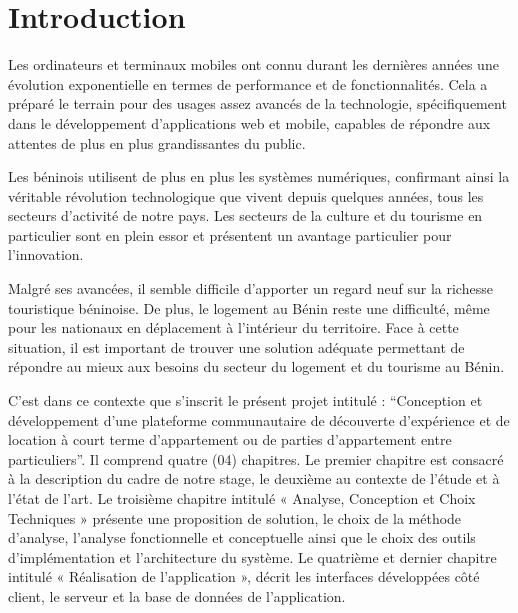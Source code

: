 \cleardoublepage
{}
\chapter*{Introduction}
Les ordinateurs et terminaux mobiles ont connu durant les dernières années une évolution exponentielle en termes de performance et de fonctionnalités. Cela a préparé le terrain pour des usages assez avancés de la technologie, spécifiquement dans le développement d’applications web et mobile, capables de répondre aux attentes de plus en plus grandissantes du public.

Les béninois utilisent de plus en plus les systèmes numériques, confirmant ainsi la véritable révolution technologique que vivent depuis quelques années, tous les secteurs d’activité de notre pays. Les secteurs de la culture et du tourisme en particulier sont en plein essor et présentent un avantage particulier pour l’innovation. 

Malgré ses avancées, il semble difficile d’apporter un regard neuf sur la richesse touristique béninoise. De plus, le logement au Bénin reste une difficulté, même pour les nationaux en déplacement à l'intérieur du territoire. Face à cette situation, il est important de trouver une solution adéquate permettant de répondre au mieux aux besoins du secteur du logement et du tourisme au Bénin.

C’est dans ce contexte que s’inscrit le présent projet intitulé : “Conception et développement d’une plateforme communautaire de découverte d’expérience et de location à court terme d’appartement ou de parties d’appartement entre particuliers”. Il comprend quatre (04) chapitres. Le premier chapitre est consacré à la description du cadre de notre stage, le deuxième au contexte de l’étude et à l’état de l’art. Le troisième chapitre intitulé « Analyse, Conception et Choix Techniques » présente une proposition de solution, le choix de la méthode d'analyse, l’analyse fonctionnelle et conceptuelle ainsi que le choix des outils d'implémentation et l’architecture du système. Le quatrième et dernier chapitre intitulé « Réalisation de l’application », décrit les interfaces développées côté client, le serveur et la base de données de l’application.
